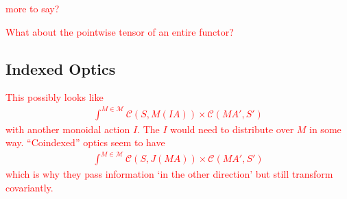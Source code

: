 \documentclass[11pt,a4paper]{article}
\theoremstyle{plain}
\theoremstyle{definition}
\newcommand{\C}{\mathscr{C}}
\newcommand{\M}{\mathscr{M}}
\newcommand{\todo}[1]{\textcolor{red}{\small #1}}
\begin{document}
\todo{more to say?}

\todo{What about the pointwise tensor of an entire functor?}

\subsection{Indexed Optics}
\todo{
This possibly looks like
\begin{align*}
\int^{M \in \M} \C(S, M(IA)) \times \C(M A', S')
\end{align*}
with another monoidal action $I$. The $I$ would need to distribute over $M$ in some way. ``Coindexed'' optics seem to have 
\begin{align*}
\int^{M \in \M} \C(S, J(MA)) \times \C(M A', S')
\end{align*}
which is why they pass information `in the other direction' but still transform covariantly.
}
\end{document}
